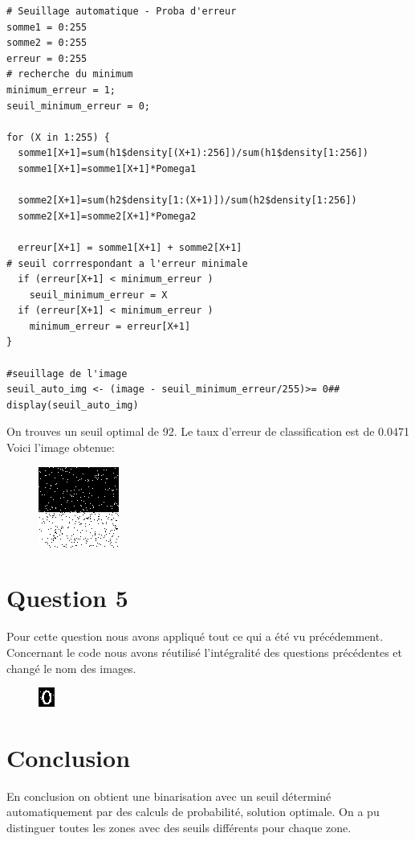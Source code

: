 \documentclass[a4paper,12pt]{report}
\begin{document}
\begin{lstlisting}
# Seuillage automatique - Proba d'erreur
somme1 = 0:255
somme2 = 0:255
erreur = 0:255
# recherche du minimum
minimum_erreur = 1;
seuil_minimum_erreur = 0;

for (X in 1:255) {
  somme1[X+1]=sum(h1$density[(X+1):256])/sum(h1$density[1:256])
  somme1[X+1]=somme1[X+1]*Pomega1

  somme2[X+1]=sum(h2$density[1:(X+1)])/sum(h2$density[1:256])
  somme2[X+1]=somme2[X+1]*Pomega2
  
  erreur[X+1] = somme1[X+1] + somme2[X+1]
# seuil corrrespondant a l'erreur minimale
  if (erreur[X+1] < minimum_erreur ) 
    seuil_minimum_erreur = X
  if (erreur[X+1] < minimum_erreur ) 
    minimum_erreur = erreur[X+1]
}

#seuillage de l'image
seuil_auto_img <- (image - seuil_minimum_erreur/255)>= 0##
display(seuil_auto_img)
\end{lstlisting}

On trouves un seuil optimal de 92.
Le taux d'erreur de classification est de 0.0471
Voici l'image obtenue:

\begin{figure}[!ht]
	\center
	\includegraphics[scale=1]{image/image_seuil_auto.png}
\end{figure}

\newpage

\section*{Question 5}

Pour cette question nous avons appliqué tout ce qui a été vu précédemment. 
Concernant le code nous avons réutilisé l'intégralité des questions précédentes et changé le nom des images.

\begin{figure}[!ht]
	\center
	\includegraphics[scale=2]{image/zero_traite.png}
\end{figure}



\section*{Conclusion}

En conclusion on obtient une binarisation avec un seuil déterminé automatiquement par des calculs de probabilité, solution optimale. On a pu distinguer toutes les zones avec des seuils différents pour chaque zone.
\end{document}
